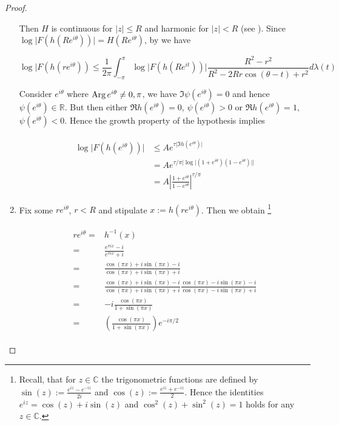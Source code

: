 \begin{proof}
\begin{enumerate}[label = \textbf{(\roman*.)}]
Then $H$ is continuous for $\vert z \vert \leqslant R$ and harmonic for $\vert z \vert < R$ (see \cite[234--235]{rudin:rc_analysis:1987}). Since $\log\vert F(h(Re^{i\theta}))\vert = H(Re^{i\theta})$, by \cite[336]{rudin:rc_analysis:1987} we have

\begin{equation}
	\log\vert F(h(re^{i\theta})) \leqslant \frac{1}{2\pi} \int_{-\pi}^\pi \log\vert F(h(Re^{it}))\vert \frac{R^2 - r^2}{R^2 - 2Rr\cos(\theta - t) + r^2} d\lambda(t) 
\end{equation}

Consider $e^{i\theta}$ where $\operatorname{Arg} e^{i\theta} \neq 0,\pi$, we have $\Im \psi(e^{i\theta}) = 0$ and hence $\psi(e^{i\theta}) \in \mathbb{R}$. But then either $\Re h(e^{i\theta}) = 0$, $\psi(e^{i\theta}) > 0$ or $\Re h(e^{i\theta}) = 1$, $\psi(e^{i\theta}) < 0$. Hence the growth property of the hypothesis implies

\begin{gather}
	\begin{aligned}
		\log \vert F(h(e^{i\theta})) \vert &\leqslant Ae^{\tau\vert \Im h(e^{i\theta})\vert}\\
		&= Ae^{\tau/\pi\vert \log\vert (1 + e^{i\theta})(1 - e^{i\theta})\vert\vert}\\
		&= A \left\vert \frac{1 + e^{i\theta}}{1 - e^{i\theta}} \right\vert^{\tau/\pi}
	\end{aligned}
\end{gather}

\item Fix some $re^{i\theta}$, $r < R$ and stipulate $x := h(re^{i\theta})$. Then we obtain \footnote{
		Recall, that for $z \in \mathbb{C}$ the trigonometric functions are defined by $\sin(z) := \frac{e^{iz} - e^{-iz}}{2i}$ and $\cos(z) := \frac{e^{iz} + e^{-iz}}{2}$. Hence the identities $e^{iz} = \cos(z) + i\sin(z)$ and $\cos^2(z) + \sin^2(z) = 1$ holds for any $z \in \mathbb{C}$.	
	}

	\begin{gather}
		\begin{aligned}
			re^{i\theta} =& h^{-1}(x)\\
			=& \frac{e^{\pi i x}- i}{e^{\pi i x} + i}\\
			=& \frac{\cos(\pi x) + i\sin(\pi x) - i}{\cos(\pi x) + i\sin(\pi x) + i}\\
			=& \frac{\cos(\pi x) + i\sin(\pi x) - i}{\cos(\pi x) + i\sin(\pi x) + i}\frac{\cos(\pi x) - i\sin(\pi x) - i}{\cos(\pi x) - i\sin(\pi x) + i}\\
			=& -i \frac{\cos(\pi x)}{1 + \sin(\pi x)}\\
			=& \left( \frac{\cos(\pi x)}{1 + \sin(\pi x)} \right)e^{-i\pi/2}
		\end{aligned}
		\label{eq:radius_angle}
	\end{gather}


\end{enumerate}
\end{proof}
